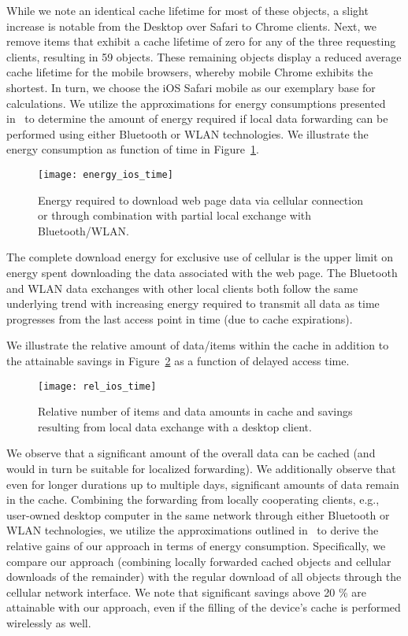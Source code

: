 While we note an identical cache lifetime for most of these objects, a slight increase is notable from the Desktop over Safari to Chrome clients.  
Next, we remove items that exhibit a cache lifetime of zero for any of the three requesting clients, resulting in 59 objects.
These remaining objects display a reduced average cache lifetime for the mobile browsers, whereby mobile Chrome exhibits the shortest.
In turn, we choose the iOS Safari mobile as our exemplary base for calculations. 
We utilize the approximations for energy consumptions presented in~\cite{PeFiWi11} to determine the amount of energy required if local data forwarding can be performed using either Bluetooth or WLAN technologies. 
We illustrate the energy consumption as function of time in Figure~\ref{fig:ios_time_energy}.
\begin{figure}
\centering
\texttt{[image: energy\_ios\_time]}
		\caption{Energy required to download web page data via cellular connection or through combination with partial local exchange with Bluetooth/WLAN.}
\label{fig:ios_time_energy}
\end{figure}

The complete download energy for exclusive use of cellular is the upper limit on energy spent downloading the data associated with the web page. 
The Bluetooth and WLAN data exchanges with other local clients both follow the same underlying trend with increasing energy required to transmit all data as time progresses from the last access point in time (due to cache expirations).

We illustrate the relative amount of data/items within the cache in addition to the attainable savings in Figure~\ref{fig:rel_ios_time} as a function of delayed access time. 
\begin{figure}
\centering
\texttt{[image: rel\_ios\_time]}
	\caption{Relative number of items and data amounts in cache and savings resulting from local data exchange with a desktop client.}
\label{fig:rel_ios_time}
\end{figure}

We observe that a significant amount of the overall data can be cached (and would in turn be suitable for localized forwarding).
We additionally observe that even for longer durations up to multiple days, significant amounts of data remain in the cache.
Combining the forwarding from locally cooperating clients, e.g., user-owned desktop computer in the same network through either Bluetooth or WLAN technologies, we utilize the approximations outlined in~\cite{Se13} to derive the relative gains of our approach in terms of energy consumption. 
Specifically, we compare our approach (combining locally forwarded cached objects and cellular downloads of the remainder) with the regular download of all objects through the cellular network interface. 
We note that significant savings above 20 \% are attainable with our approach, even if the filling of the device's cache is performed wirelessly as well.

